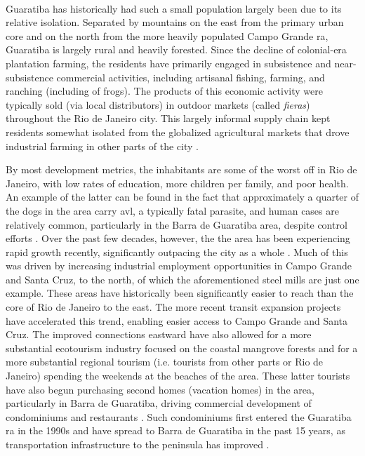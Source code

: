 \paragraph{} \label{sec:guaratiba-people} \leavevmode\newline

Guaratiba has historically had such a small population largely been due to its relative isolation. Separated by mountains on the east from the primary urban core and on the north from the more heavily populated Campo Grande \ac{ra}, Guaratiba is largely rural and heavily forested. Since the decline of colonial-era plantation farming, the residents have primarily engaged in subsistence and near-subsistence commercial activities, including artisanal fishing, farming, and ranching (including of frogs). The products of this economic activity were typically sold (via local distributors) in outdoor markets (called \textit{fieras}) throughout the Rio de Janeiro city. This largely informal supply chain kept residents somewhat isolated from the globalized agricultural markets that drove industrial farming in other parts of the city \cite{fernandesDecodificandoGeografiasPreteritas2010}.

By most development metrics, the inhabitants are some of the worst off in Rio de Janeiro, with low rates of education, more children per family, and poor health. An example of the latter can be found in the fact that approximately a quarter of the dogs in the area carry \ac{avl}, a typically fatal parasite, and human cases are relatively common, particularly in the Barra de Guaratiba area, despite control efforts \cite{cabreraCanineVisceralLeishmaniasis2003}. Over the past few decades, however, the the area has been experiencing rapid growth recently, significantly outpacing the city as a whole \cite{pizzolatoLOCALIZACAOESCOLASPUBLICAS2013}. Much of this was driven by increasing industrial employment opportunities in Campo Grande and Santa Cruz, to the north, of which the aforementioned steel mills are just one example. These areas have historically been significantly easier to reach than the core of Rio de Janeiro to the east. The more recent transit expansion projects have accelerated this trend, enabling easier access to Campo Grande and Santa Cruz. The improved connections eastward have also allowed for a more substantial ecotourism industry focused on the coastal mangrove forests and for a more substantial regional tourism (i.e. tourists from other parts or Rio de Janeiro) spending the weekends at the beaches of the area. These latter tourists have also begun purchasing second homes (vacation homes) in the area, particularly in Barra de Guaratiba, driving commercial development of condominiums and restaurants \cite{herzogGuaratibaVerdeSubsidios2009}. Such condominiums first entered the Guaratiba \ac{ra} in the 1990s and have spread to Barra de Guaratiba in the past 15 years, as transportation infrastructure to the peninsula has improved \cite{fernandesDecodificandoGeografiasPreteritas2010}. 

